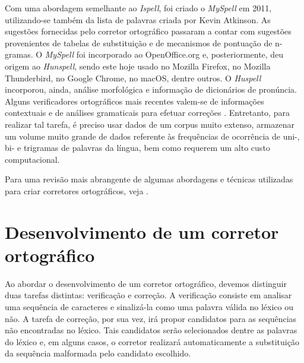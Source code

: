 \documentclass{textolivre}
\begin{document}
Com uma abordagem semelhante ao
\textit{Ispell}, foi criado o \textit{MySpell} em 2011, utilizando-se também da lista de palavras 
criada por Kevin Atkinson. As sugestões fornecidas pelo corretor ortográfico passaram a contar com
sugestões provenientes de tabelas de substituição e de mecanismos de pontuação de n-gramas. 
O \textit{MySpell} foi incorporado ao OpenOffice.org e, posteriormente, deu origem ao \textit{Hunspell}, sendo
este hoje usado no Mozilla Firefox, no Mozilla Thunderbird, no Google Chrome, no macOS, dentre outros.
O \textit{Huspell} incorporou, ainda, análise morfológica e informação de dicionários de pronúncia. %
Alguns verificadores ortográficos mais recentes valem-se de informações
contextuais e de análises gramaticais para 
efetuar correções  \cite{golding1996,verberne2002,gupta2020}.
Entretanto, para realizar tal tarefa,
é preciso usar dados de um corpus muito extenso,
armazenar um volume muito grande de dados referente às frequências de ocorrência de uni-, 
bi- e trigramas de palavras da língua, bem como requerem um alto custo computacional.







Para uma revisão mais abrangente de algumas abordagens e técnicas utilizadas para criar corretores
ortográficos, veja \textcite{kukich1992,verberne2002,mitton2010}.

\section{Desenvolvimento de um corretor ortográfico}\label{sec-desenv}
Ao abordar o desenvolvimento de um corretor ortográfico, devemos distinguir duas tarefas distintas:
verificação e correção.
A verificação consiste em analisar uma sequência de caracteres e sinalizá-la como uma palavra válida
no léxico ou não. A tarefa de correção, por sua vez, irá propor candidatos para as sequências não encontradas no léxico.
Tais candidatos serão selecionados dentre as palavras do léxico e, em alguns casos, 
o corretor realizará automaticamente a substituição da sequência malformada pelo candidato escolhido.
\end{document}
